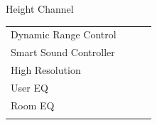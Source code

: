 \documentclass{beamer}
\begin{document}
\begin{frame}[t]{Height Channel}
\begin{tiny}
\begin{tabular}{@{}lccc@{}}
				Dynamic Range Control & \color{black}{Off} & & \\
				Smart Sound Controller & \color{black}{Off} & & \\
				High Resolution & \color{black}{Off} & & \\
				User EQ & \color{black}{Off} & & \\
				Room EQ & \color{black}{Off} & & \\
				\color{blue}{OSD Volume} & \color{blue}{On} &  \color{blue}{Vol.40} & \\
				\midrule
			\end{tabular}
		\end{tiny}
		
	\end{frame}
	
	
\end{document}
